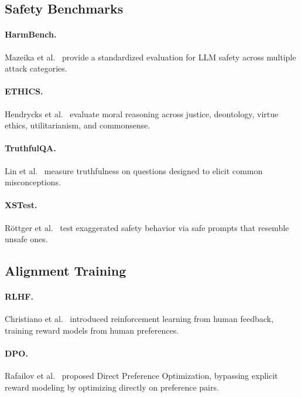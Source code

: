 \subsection{Safety Benchmarks}


\paragraph{HarmBench.}
Mazeika et al.~\citep{mazeika2024harmbench} provide a standardized
evaluation for LLM safety across multiple attack categories.

\paragraph{ETHICS.}
Hendrycks et al.~\citep{hendrycks2021ethics} evaluate moral reasoning
across justice, deontology, virtue ethics, utilitarianism, and commonsense.

\paragraph{TruthfulQA.}
Lin et al.~\citep{lin2022truthfulqa} measure truthfulness on questions
designed to elicit common misconceptions.

\paragraph{XSTest.}
R\"{o}ttger et al.~\citep{rottger2024xstest} test exaggerated safety
behavior via safe prompts that resemble unsafe ones.

\subsection{Alignment Training}

\paragraph{RLHF.}
Christiano et al.~\citep{christiano2017deep} introduced reinforcement
learning from human feedback, training reward models from human
preferences.

\paragraph{DPO.}
Rafailov et al.~\citep{rafailov2023direct} proposed Direct Preference
Optimization, bypassing explicit reward modeling by optimizing directly
on preference pairs.


